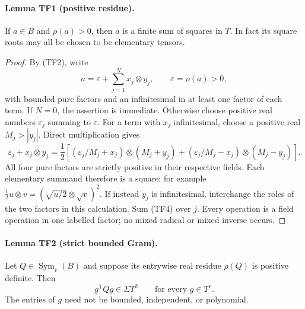 \paragraph{Lemma TF1 (positive residue).}
If $a\in B$ and $\rho(a)>0$, then $a$ is a finite sum of squares in
$T$. In fact its square roots may all be chosen to be elementary
tensors.

\begin{proof}
By (TF2), write
\[
 a=\varepsilon+\sum_{j=1}^N x_j\otimes y_j,\qquad
 \varepsilon=\rho(a)>0,
 \tag{TF3}
\]
with bounded pure factors and an infinitesimal in at least one factor
of each term. If $N=0$, the assertion is immediate. Otherwise choose
positive real numbers $\varepsilon_j$ summing to $\varepsilon$.
For a term with $x_j$ infinitesimal, choose a positive real
$M_j>|y_j|$. Direct multiplication gives
\[
 \varepsilon_j+x_j\otimes y_j
 =\frac12\left[
  (\varepsilon_j/M_j+x_j)\otimes(M_j+y_j)
 +(\varepsilon_j/M_j-x_j)\otimes(M_j-y_j)\right].
 \tag{TF4}
\]
All four pure factors are strictly positive in their respective
fields. Each elementary summand therefore is a square: for example
$\tfrac12u\otimes v=(\sqrt{u/2}\otimes\sqrt v)^2$.
If instead $y_j$ is infinitesimal, interchange the roles of the
two factors in this calculation. Sum (TF4) over $j$. Every operation
is a field operation in one labelled factor; no mixed radical or
mixed inverse occurs.
\end{proof}

\paragraph{Lemma TF2 (strict bounded Gram).}
Let $Q\in\operatorname{Sym}_r(B)$ and suppose its entrywise real
residue $\rho(Q)$ is positive definite. Then
\[
                 g^{\mathsf T}Qg\in\Sigma T^2
                 \qquad\text{for every }g\in T^r.
 \tag{TF5}
\]
The entries of $g$ need not be bounded, independent, or polynomial.

